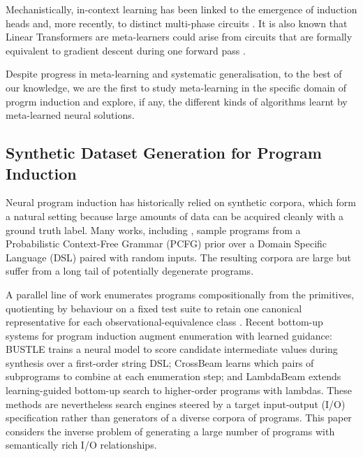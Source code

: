 \documentclass[12pt]{article}
\begin{document}
Mechanistically, in-context learning has been linked to the emergence of induction heads \citep{olsson2022context} and, more recently, to distinct multi-phase circuits \citep{minegishi2025beyond}. It is also known that Linear Transformers are meta-learners  \citep{schlag2021linear} could arise from circuits that are formally equivalent to gradient descent during one forward pass \citep{von2023transformers}.

Despite progress in meta-learning and systematic generalisation, to the best of our knowledge, we are the first to study meta-learning in the specific domain of progrm induction and explore, if any, the different kinds of algorithms learnt by meta-learned neural solutions.

\subsection{Synthetic Dataset Generation for Program Induction}
\label{sec:related-datasets}

Neural program induction has historically relied on synthetic corpora, which form a natural setting because large amounts of data can be acquired cleanly with a ground truth label. Many works, including \citet{devlin2017robustfill, balog2017deepcoder,bunel2018grammar, abolafia2018priority, shi2024exedec}, sample programs from a Probabilistic Context-Free Grammar (PCFG) prior over a Domain Specific Language (DSL) paired with random inputs. The resulting corpora are large but suffer from a long tail of potentially degenerate programs.

A parallel line of work enumerates programs compositionally from the primitives, quotienting by behaviour on a fixed test suite to retain one canonical representative for each observational-equivalence class \citep{udupa2013transit}. Recent bottom-up systems for program induction augment enumeration with learned guidance: BUSTLE \citep{odena2021bustle} trains a neural model to score candidate intermediate values during synthesis over a first-order string DSL; CrossBeam \citep{shi2022crossbeam} learns which pairs of subprograms to combine at each enumeration step; and LambdaBeam \citep{shi2023lambdabeam} extends learning-guided bottom-up search to higher-order programs with lambdas. These methods are nevertheless search engines steered by a target input-output (I/O) specification rather than generators of a diverse corpora of programs. This paper considers the inverse problem of generating a large number of programs with semantically rich I/O relationships.
\end{document}
